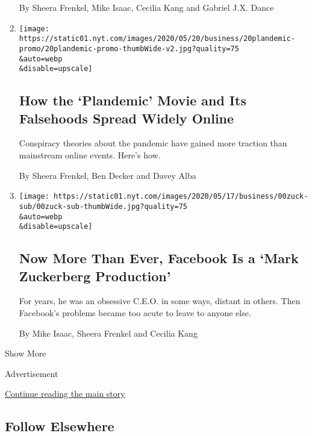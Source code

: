 \begin{enumerate}
  By Sheera Frenkel, Mike Isaac, Cecilia Kang and Gabriel J.X. Dance
\item
  \href{/2020/05/20/technology/plandemic-movie-youtube-facebook-coronavirus.html}{}

  \texttt{[image: https://static01.nyt.com/images/2020/05/20/business/20plandemic-promo/20plandemic-promo-thumbWide-v2.jpg?quality=75\\\&auto=webp\\\&disable=upscale]}

  \hypertarget{how-the-plandemic-movie-and-its-falsehoods-spread-widely-online}{%
  \subsection{How the `Plandemic' Movie and Its Falsehoods Spread Widely
  Online}\label{how-the-plandemic-movie-and-its-falsehoods-spread-widely-online}}

  Conspiracy theories about the pandemic have gained more traction than
  mainstream online events. Here's how.

  By Sheera Frenkel, Ben Decker and Davey Alba
\item
  \href{/2020/05/16/technology/zuckerberg-facebook-coronavirus.html}{}

  \texttt{[image: https://static01.nyt.com/images/2020/05/17/business/00zuck-sub/00zuck-sub-thumbWide.jpg?quality=75\\\&auto=webp\\\&disable=upscale]}

  \hypertarget{now-more-than-ever-facebook-is-a-mark-zuckerberg-production}{%
  \subsection{Now More Than Ever, Facebook Is a `Mark Zuckerberg
  Production'}\label{now-more-than-ever-facebook-is-a-mark-zuckerberg-production}}

  For years, he was an obsessive C.E.O. in some ways, distant in others.
  Then Facebook's problems became too acute to leave to anyone else.

  By Mike Isaac, Sheera Frenkel and Cecilia Kang
\end{enumerate}

Show More

Advertisement

\protect\hyperlink{after-mid2}{Continue reading the main story}

\hypertarget{follow-elsewhere}{%
\subsection{Follow Elsewhere}\label{follow-elsewhere}}

